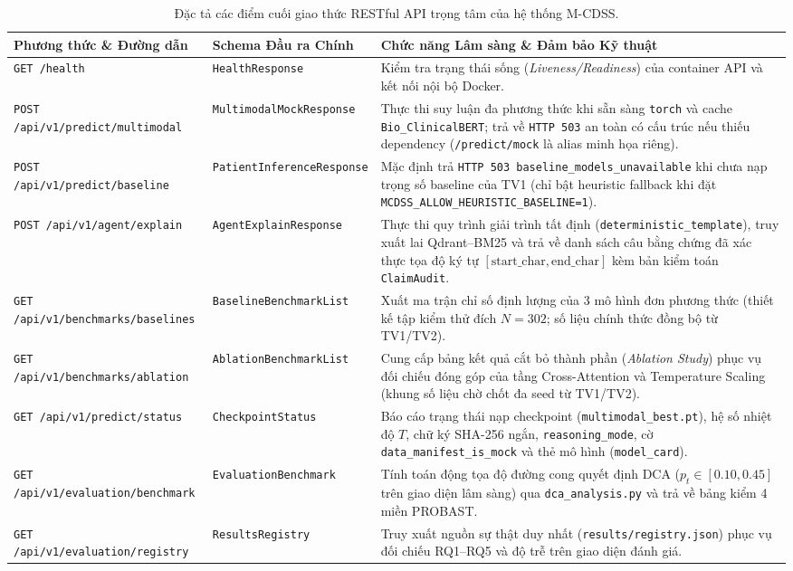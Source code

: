 \begin{table}[htbp]
\centering
\caption{Đặc tả các điểm cuối giao thức RESTful API trọng tâm của hệ thống M-CDSS.}
\label{tab:rest_endpoints}
\footnotesize
\begin{tabularx}{\textwidth}{@{}llX@{}}
\toprule
\textbf{Phương thức \& Đường dẫn} & \textbf{Schema Đầu ra Chính} & \textbf{Chức năng Lâm sàng \& Đảm bảo Kỹ thuật} \\
\midrule
\texttt{GET /health} & \texttt{HealthResponse} & Kiểm tra trạng thái sống (\textit{Liveness/Readiness}) của container API và kết nối nội bộ Docker. \\[0.4em]
\texttt{POST /api/v1/predict/multimodal} & \texttt{MultimodalMockResponse} & Thực thi suy luận đa phương thức khi sẵn sàng \texttt{torch} và cache \texttt{Bio\_ClinicalBERT}; trả về \texttt{HTTP 503} an toàn có cấu trúc nếu thiếu dependency (\texttt{/predict/mock} là alias minh họa riêng). \\[0.4em]
\texttt{POST /api/v1/predict/baseline} & \texttt{PatientInferenceResponse} & Mặc định trả \texttt{HTTP 503 baseline\_models\_unavailable} khi chưa nạp trọng số baseline của TV1 (chỉ bật heuristic fallback khi đặt \texttt{MCDSS\_ALLOW\_HEURISTIC\_BASELINE=1}). \\[0.4em]
\texttt{POST /api/v1/agent/explain} & \texttt{AgentExplainResponse} & Thực thi quy trình giải trình tất định (\texttt{deterministic\_template}), truy xuất lai Qdrant--BM25 và trả về danh sách câu bằng chứng đã xác thực tọa độ ký tự $[\text{start\_char}, \text{end\_char}]$ kèm bản kiểm toán \texttt{ClaimAudit}. \\[0.4em]
\texttt{GET /api/v1/benchmarks/baselines} & \texttt{BaselineBenchmarkList} & Xuất ma trận chỉ số định lượng của 3 mô hình đơn phương thức (thiết kế tập kiểm thử đích $N=302$; số liệu chính thức đồng bộ từ TV1/TV2). \\[0.4em]
\texttt{GET /api/v1/benchmarks/ablation} & \texttt{AblationBenchmarkList} & Cung cấp bảng kết quả cắt bỏ thành phần (\textit{Ablation Study}) phục vụ đối chiếu đóng góp của tầng Cross-Attention và Temperature Scaling (khung số liệu chờ chốt đa seed từ TV1/TV2). \\[0.4em]
\texttt{GET /api/v1/predict/status} & \texttt{CheckpointStatus} & Báo cáo trạng thái nạp checkpoint (\texttt{multimodal\_best.pt}), hệ số nhiệt độ $T$, chữ ký SHA-256 ngắn, \texttt{reasoning\_mode}, cờ \texttt{data\_manifest\_is\_mock} và thẻ mô hình (\texttt{model\_card}). \\
\texttt{GET /api/v1/evaluation/benchmark} & \texttt{EvaluationBenchmark} & Tính toán động tọa độ đường cong quyết định DCA ($p_t \in [0.10, 0.45]$ trên giao diện lâm sàng) qua \texttt{dca\_analysis.py} và trả về bảng kiểm 4 miền PROBAST. \\
\texttt{GET /api/v1/evaluation/registry} & \texttt{ResultsRegistry} & Truy xuất nguồn sự thật duy nhất (\texttt{results/registry.json}) phục vụ đối chiếu RQ1--RQ5 và độ trễ trên giao diện đánh giá. \\
\bottomrule
\end{tabularx}
\end{table}

